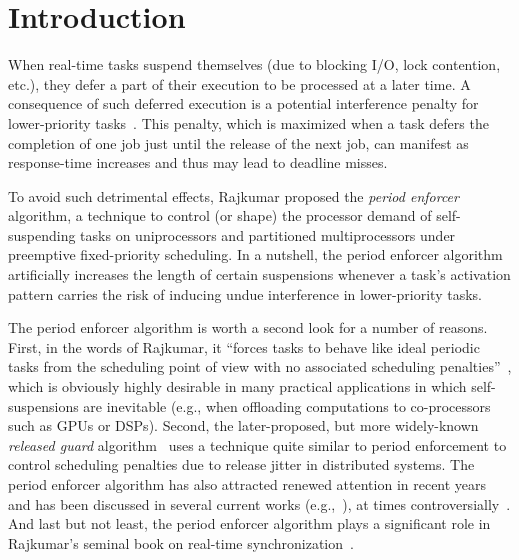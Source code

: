 


\section{Introduction} 
When real-time tasks suspend themselves (due to blocking I/O, lock contention, etc.), they defer a part of their execution to be processed at a later time. A consequence of such deferred execution is a potential interference penalty for lower-priority tasks~\cite{LSS:87,LSST:91,Ra:90,ABRTW:93,SLS:95,WC16-suspend-DATE,ecrts15nelissen}. This penalty, which is maximized when a task defers the completion of one job just until the release of the next job, can manifest as response-time increases and thus may lead to deadline misses.

To avoid such detrimental effects,  Rajkumar \cite{Raj:suspension1991} proposed the \emph{period enforcer} algorithm,  a technique to control (or shape) the processor demand of self-suspending tasks on uniprocessors and partitioned multiprocessors under preemptive fixed-priority scheduling. In a nutshell, the period enforcer algorithm artificially increases the length of certain suspensions whenever a task's activation pattern carries the risk of inducing undue interference in lower-priority tasks. 

The period enforcer algorithm is worth a second look for a number of reasons. First, in the words of Rajkumar, it ``forces tasks to behave like ideal periodic tasks from the scheduling point of view with no associated scheduling penalties''~\cite{Raj:suspension1991}, which is obviously highly desirable in many practical applications in which self-suspensions are inevitable (e.g., when offloading computations to co-processors such as GPUs or DSPs). Second, the later-proposed, but more widely-known \emph{released guard} algorithm~\cite{SL:96} uses a technique quite similar to period enforcement to control scheduling penalties due to release jitter in distributed systems. The period enforcer algorithm has also attracted renewed attention in recent years and has been discussed in several current works  (e.g.,~\cite{DBLP:conf/rtss/ChenL14,LNR:09,LR:10,Lak:11,LC:14,KANR:13,HY:11,CA:09,CA:10,CA:10b}), at times controversially~\cite{BA:08a}. And last but not least, the period enforcer algorithm plays a significant role in Rajkumar's seminal book on   real-time  synchronization~\cite{Raj:91}. 

